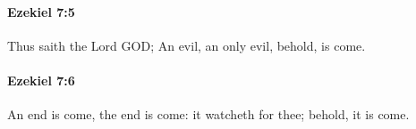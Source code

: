 		\paragraph{Ezekiel 7:5} %
			\label{EZEKIEL-7-5}

			Thus saith the Lord GOD; An evil, an only evil, behold, is come.


		\paragraph{Ezekiel 7:6} %
			\label{EZEKIEL-7-6}

			An end is come, the end is come: it watcheth for thee; behold, it is come.


